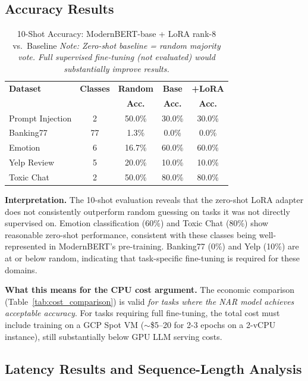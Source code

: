 \documentclass[10pt,journal,compsoc]{IEEEtran}
\theoremstyle{remark}
\begin{document}
\subsection{Accuracy Results}

\begin{table}[htbp]
\caption{10-Shot Accuracy: ModernBERT-base + LoRA rank-8 vs.\ Baseline\newline
\textit{Note: Zero-shot baseline = random majority vote. Full supervised fine-tuning (not evaluated) would substantially improve results.}}
\label{tab:accuracy}
\centering
\begin{tabular}{lcccc}
\toprule
\textbf{Dataset} & \textbf{Classes} & \textbf{Random} & \textbf{Base} & \textbf{+LoRA} \\
                 &                  & \textbf{Acc.}   & \textbf{Acc.} & \textbf{Acc.} \\
\midrule
Prompt Injection  & 2  & 50.0\% & 30.0\% & 30.0\% \\
Banking77         & 77 & 1.3\%  & 0.0\%  & 0.0\%  \\
Emotion           & 6  & 16.7\% & 60.0\% & 60.0\% \\
Yelp Review       & 5  & 20.0\% & 10.0\% & 10.0\% \\
Toxic Chat        & 2  & 50.0\% & 80.0\% & 80.0\% \\
\bottomrule
\end{tabular}
\end{table}

\textbf{Interpretation.} The 10-shot evaluation reveals that the zero-shot LoRA adapter does not consistently outperform random guessing on tasks it was not directly supervised on. Emotion classification (60\%) and Toxic Chat (80\%) show reasonable zero-shot performance, consistent with these classes being well-represented in ModernBERT's pre-training. Banking77 (0\%) and Yelp (10\%) are at or below random, indicating that task-specific fine-tuning is required for these domains.

\textbf{What this means for the CPU cost argument.} The economic comparison (Table~\ref{tab:cost_comparison}) is valid \emph{for tasks where the NAR model achieves acceptable accuracy}. For tasks requiring full fine-tuning, the total cost must include training on a GCP Spot VM ($\sim$\$5--20 for 2-3 epochs on a 2-vCPU instance), still substantially below GPU LLM serving costs.

\subsection{Latency Results and Sequence-Length Analysis}
\end{document}
